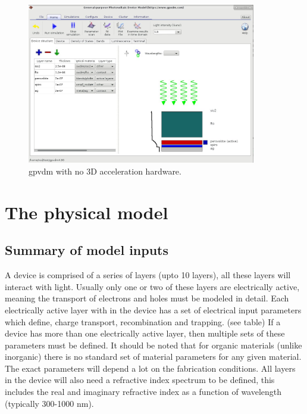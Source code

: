 \documentclass[11pt]{article}
\begin{document}
\begin{figure}[ht!]
\centering
\includegraphics[width=100mm]{./images/no_3d.jpg}
\caption{gpvdm with no 3D acceleration hardware.}
\label{fig:nothreed}
\end{figure}

\vfill
\clearpage

\section{The physical model}
\subsection{Summary of model inputs}
A device is comprised of a series of layers (upto 10 layers), all these layers will interact with light.  Usually only one or two of these layers are electrically active, meaning the transport of electrons and holes must be modeled in detail.  Each electrically active layer with in the device has a set of electrical input parameters which define, charge transport, recombination and trapping. (see table)  If a device has more than one electrically active layer, then multiple sets of these parameters must be defined.  It should be noted that for organic materials (unlike inorganic) there is no standard set of material parameters for any given material.  The exact parameters will depend a lot on the fabrication conditions.  All layers in the device will also need a refractive index spectrum to be defined, this includes the real and imaginary refractive index as a function of wavelength (typically 300-1000 nm).
 
\end{document}
